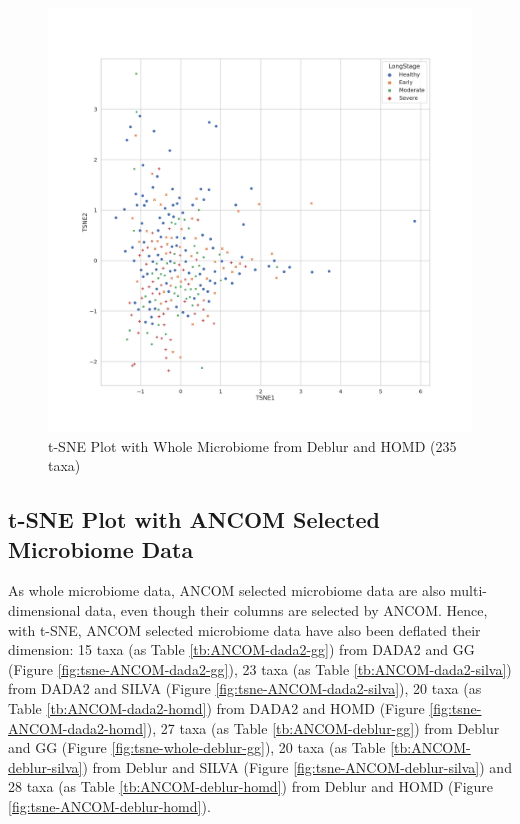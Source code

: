 \documentclass[a4paper]{article}
\begin{document}
            \begin{figure}[p]
                \centering
                \includegraphics[width=0.6 \linewidth]{figures/tSNE/Whole/whole.Deblur.homd.png}
                \caption{t-SNE Plot with Whole Microbiome from Deblur and HOMD (235 taxa)}
                \label{fig:tsne-whole-deblur-homd}
            \end{figure}

        \subsection{t-SNE Plot with ANCOM Selected Microbiome Data}
            As whole microbiome data, ANCOM selected microbiome data are also multi-dimensional data, even though their columns are selected by ANCOM. Hence, with t-SNE, ANCOM selected microbiome data have also been deflated their dimension: 15 taxa (as Table \ref{tb:ANCOM-dada2-gg}) from DADA2 and GG (Figure \ref{fig:tsne-ANCOM-dada2-gg}), 23 taxa (as Table \ref{tb:ANCOM-dada2-silva}) from DADA2 and SILVA (Figure \ref{fig:tsne-ANCOM-dada2-silva}), 20 taxa (as Table \ref{tb:ANCOM-dada2-homd}) from DADA2 and HOMD (Figure \ref{fig:tsne-ANCOM-dada2-homd}), 27 taxa (as Table \ref{tb:ANCOM-deblur-gg}) from Deblur and GG (Figure \ref{fig:tsne-whole-deblur-gg}), 20 taxa (as Table \ref{tb:ANCOM-deblur-silva}) from Deblur and SILVA (Figure \ref{fig:tsne-ANCOM-deblur-silva}) and 28 taxa (as Table \ref{tb:ANCOM-deblur-homd}) from Deblur and HOMD (Figure \ref{fig:tsne-ANCOM-deblur-homd}).
\end{document}
